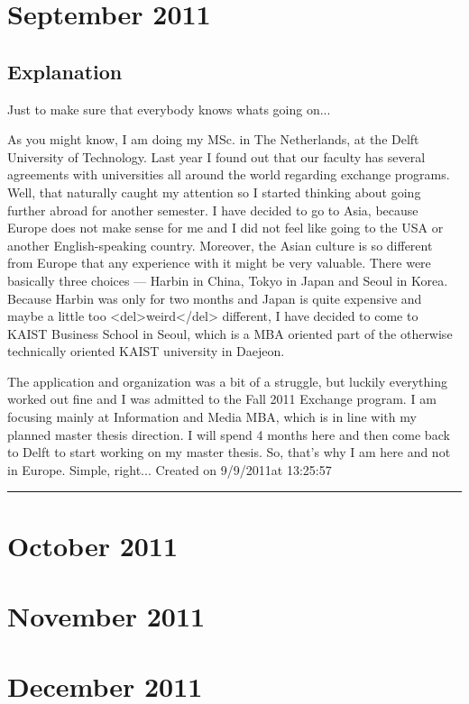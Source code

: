 \documentclass[11pt,twoside,a5paper,landscape,openright]{book}
\newenvironment{post}[0]{}{\hrule}
\newenvironment{content}[0]{}{}
\newcommand{\postdata}[7]{
	\def\postd{#4/#3/#2}
	\def\postmeta{Created on \postd at #5:#6:#7}
	\section{#1}
}
\def\postd{}
\begin{document}
\chapter{September 2011}

\begin{post}
	\postdata{Explanation}{2011}{9}{9}{13}{25}{57}
	\begin{content}
	Just to make sure that everybody knows whats going on...

As you might know, I am doing my MSc. in The Netherlands, at the Delft University of Technology. Last year I found out that our faculty has several agreements with universities all around the world regarding exchange programs. Well, that naturally caught my attention so I started thinking about going further abroad for another semester. I have decided to go to Asia, because Europe does not make sense for me and I did not feel like going to the USA or another English-speaking country. Moreover, the Asian culture is so different from Europe that any experience with it might be very valuable. There were basically three choices — Harbin in China, Tokyo in Japan and Seoul in Korea. Because Harbin was only for two months and Japan is quite expensive and maybe a little too <del>weird</del> different, I have decided to come to KAIST Business School in Seoul, which is a MBA oriented part of the otherwise technically oriented KAIST university in Daejeon.

The application and organization was a bit of a struggle, but luckily everything worked out fine and I was admitted to the Fall 2011 Exchange program. I am focusing mainly at Information and Media MBA, which is in line with my planned master thesis direction. I will spend 4 months here and then come back to Delft to start working on my master thesis. So, that's why I am here and not in Europe. Simple, right...
	\end{content}
	\postmeta
\end{post}

\chapter{October 2011}

\chapter{November 2011}

\chapter{December 2011}
\end{document}
